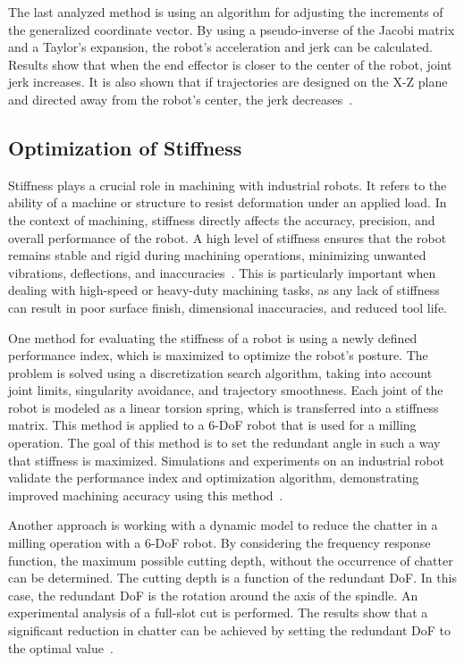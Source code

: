 The last analyzed method is using an algorithm for adjusting the increments of the generalized coordinate vector. By using a pseudo-inverse of the Jacobi matrix and a Taylor’s expansion, the robot's acceleration and jerk can be calculated. Results show that when the end effector is closer to the center of the robot, joint jerk increases. It is also shown that if trajectories are designed on the X-Z plane and directed away from the robot's center, the jerk decreases~\cite{Duong.2021}.

\subsection{Optimization of Stiffness}\label{OOS}
Stiffness plays a crucial role in machining with industrial robots. It refers to the ability of a machine or structure to resist deformation under an applied load. In the context of machining, stiffness directly affects the accuracy, precision, and overall performance of the robot. A high level of stiffness ensures that the robot remains stable and rigid during machining operations, minimizing unwanted vibrations, deflections, and inaccuracies~\cite{Wu.2022}. This is particularly important when dealing with high-speed or heavy-duty machining tasks, as any lack of stiffness can result in poor surface finish, dimensional inaccuracies, and reduced tool life. 


One method for evaluating the stiffness of a robot is using a newly defined performance index, which is maximized to optimize the robot's posture. The problem is solved using a discretization search algorithm, taking into account joint limits, singularity avoidance, and trajectory smoothness. 
Each joint of the robot is modeled as a linear torsion spring, which is transferred into a stiffness matrix. This method is applied to a 6-\acrshort{DoF} robot that is used for a milling operation. The goal of this method is to set the redundant angle in such a way that stiffness is maximized. Simulations and experiments on an industrial robot validate the performance index and optimization algorithm, demonstrating improved machining accuracy using this method~\cite{Xiong.2019}.


Another approach is working with a dynamic model to reduce the chatter in a milling operation with a 6-\acrshort{DoF} robot. By considering the frequency response function, the maximum possible cutting depth, without the occurrence of chatter can be determined. The cutting depth is a function of the redundant \acrshort{DoF}. In this case, the redundant \acrshort{DoF} is the rotation around the axis of the spindle. An experimental analysis of a full-slot cut is performed. The results show that a significant reduction in chatter can be achieved by setting the redundant \acrshort{DoF} to the optimal value~\cite{Wang.2022}.

